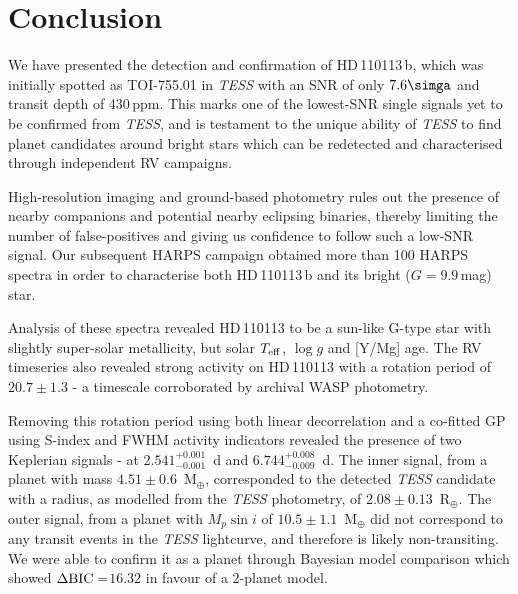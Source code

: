 \documentclass[fleqn,usenatbib]{mnras}
\newcommand{\tess}{{\it TESS}}
\newcommand{\harps}{{HARPS}}
\newcommand{\rearth}{R$_{\oplus}$}
\newcommand{\mearth}{M$_{\oplus}$}
\newcommand{\teff}{$T_{\rm eff}$}
\newcommand{\logg}{$\log g$}
\newcommand{\TPzero}{ $ 2.541^{+0.001}_{-0.001} $ }
\newcommand{\TPone}{ $ 6.744^{+0.008}_{-0.009} $ }
\newcommand{\TMpzero}{ $ 4.51 \pm 0.6 $ }
\newcommand{\TMpone}{ $ 10.5 \pm 1.1 $ }
\newcommand{\Trpl}{ $ 2.08 \pm 0.13 $ }
\newcommand{\Tperiod}{ $ 20.7 \pm 1.3 $ }
\newcommand{\TTplanet}{TOI-755.01}
\newcommand{\Tstar}{HD\,110113}
\newcommand{\Tplanet}{HD\,110113\,b}
\newcommand{\TdeltaBIC}{$16.32$}
\begin{document}

\section{Conclusion}
We have presented the detection and confirmation of \Tplanet{}, which was initially spotted as \TTplanet{} in \tess{} with an SNR of only $7.6\simga$ and transit depth of 430\,ppm.
This marks one of the lowest-SNR single signals yet to be confirmed from \tess{}, and is testament to the unique ability of \tess{} to find planet candidates around bright stars which can be redetected and characterised through independent RV campaigns.

High-resolution imaging and ground-based photometry rules out the presence of nearby companions and potential nearby eclipsing binaries, thereby limiting the number of false-positives and giving us confidence to follow such a low-SNR signal.
Our subsequent HARPS campaign obtained more than 100 \harps{} spectra in order to characterise both \Tplanet{} and its bright ($G=9.9$\,mag) star.

Analysis of these spectra revealed \Tstar{} to be a sun-like G-type star with slightly super-solar metallicity, but solar \teff{}, \logg{} and [Y/Mg] age.
The RV timeseries also revealed strong activity on \Tstar{} with a rotation period of \Tperiod{} - a timescale corroborated by archival WASP photometry.

Removing this rotation period using both linear decorrelation and a co-fitted GP using S-index and FWHM activity indicators revealed the presence of two Keplerian signals - at \TPzero{}\,d and \TPone{}\,d.
The inner signal, from a planet with mass \TMpzero{}\,\mearth{}, corresponded to the detected \tess{} candidate with a radius, as modelled from the \tess{} photometry, of \Trpl{}\,\rearth{}.
The outer signal, from a planet with $M_p\sin{i}$ of \TMpone{}\,\mearth{} did not correspond to any transit events in the \tess{} lightcurve, and therefore is likely non-transiting.
We were able to confirm it as a planet through Bayesian model comparison which showed $\Delta{\rm BIC}= $\TdeltaBIC{} in favour of a 2-planet model.
\end{document}
